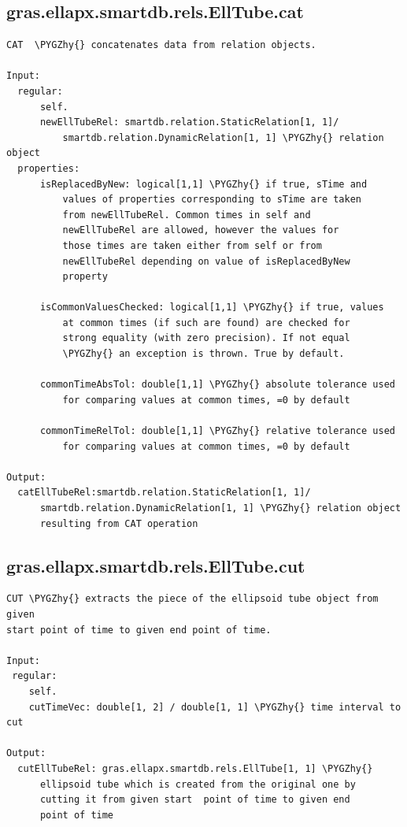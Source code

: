 \documentclass[letterpaper,10pt,english]{sphinxmanual}
\def\PYGZhy{\char`\-}
\begin{document}
\subsection{gras.ellapx.smartdb.rels.EllTube.cat}
\label{chap_functions:gras-ellapx-smartdb-rels-elltube-cat}
\begin{Verbatim}[commandchars=\\\{\}]
CAT  \PYGZhy{} concatenates data from relation objects.

Input:
  regular:
      self.
      newEllTubeRel: smartdb.relation.StaticRelation[1, 1]/
          smartdb.relation.DynamicRelation[1, 1] \PYGZhy{} relation object
  properties:
      isReplacedByNew: logical[1,1] \PYGZhy{} if true, sTime and
          values of properties corresponding to sTime are taken
          from newEllTubeRel. Common times in self and
          newEllTubeRel are allowed, however the values for
          those times are taken either from self or from
          newEllTubeRel depending on value of isReplacedByNew
          property

      isCommonValuesChecked: logical[1,1] \PYGZhy{} if true, values
          at common times (if such are found) are checked for
          strong equality (with zero precision). If not equal
          \PYGZhy{} an exception is thrown. True by default.

      commonTimeAbsTol: double[1,1] \PYGZhy{} absolute tolerance used
          for comparing values at common times, =0 by default

      commonTimeRelTol: double[1,1] \PYGZhy{} relative tolerance used
          for comparing values at common times, =0 by default

Output:
  catEllTubeRel:smartdb.relation.StaticRelation[1, 1]/
      smartdb.relation.DynamicRelation[1, 1] \PYGZhy{} relation object
      resulting from CAT operation
\end{Verbatim}


\subsection{gras.ellapx.smartdb.rels.EllTube.cut}
\label{chap_functions:gras-ellapx-smartdb-rels-elltube-cut}
\begin{Verbatim}[commandchars=\\\{\}]
CUT \PYGZhy{} extracts the piece of the ellipsoid tube object from given
start point of time to given end point of time.

Input:
 regular:
    self.
    cutTimeVec: double[1, 2] / double[1, 1] \PYGZhy{} time interval to cut

Output:
  cutEllTubeRel: gras.ellapx.smartdb.rels.EllTube[1, 1] \PYGZhy{}
      ellipsoid tube which is created from the original one by
      cutting it from given start  point of time to given end
      point of time
\end{Verbatim}
\end{document}
